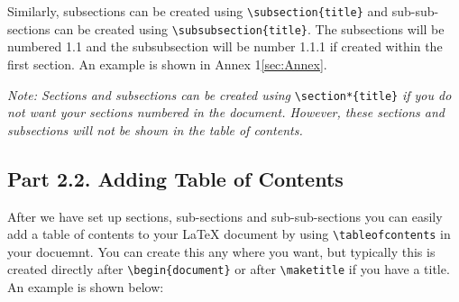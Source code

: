 \documentclass[12pts]{report}
\begin{document}
Similarly, subsections can be created using \verb|\subsection{title}| and sub-sub-sections can be created using \verb|\subsubsection{title}|. The subsections will be numbered 1.1 and the subsubsection will be number 1.1.1 if created within the first section. An example is shown in Annex 1\ref{sec:Annex}. 

\textit{Note: Sections and subsections can be created using} \verb|\section*{title}| \textit{if you do not want your sections numbered in the document. However, these sections and subsections will not be shown in the table of contents.}

\subsection*{Part 2.2. Adding Table of Contents}

After we have set up sections, sub-sections and sub-sub-sections you can easily add a table of contents to your {\LaTeX} document by using \verb|\tableofcontents| in your docuemnt. You can create this any where you want, but typically this is created directly after \verb|\begin{document}| or after \verb|\maketitle| if you have a title.  An example is shown below:
\end{document}
